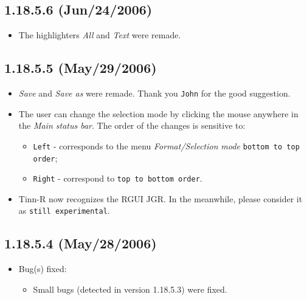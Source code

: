\subsection*{1.18.5.6 (Jun/24/2006)}
\begin{itemize}
  \item The highlighters \textit{All} and \textit{Text} were remade.
\end{itemize}


\subsection*{1.18.5.5 (May/29/2006)}
\begin{itemize}
  \item \textit{Save} and \textit{Save as} were remade. Thank you
    \texttt{John} for the good suggestion.
  \item The user can change the selection mode by clicking the mouse
    anywhere in the \textit{Main status bar}. The order of the changes
    is sensitive to:
    \begin{itemize}
      \item \texttt{Left} - corresponds to the menu
        \textit{Format/Selection mode} \texttt{bottom to top order};
      \item \texttt{Right} - correspond to \texttt{top to bottom order}.
    \end{itemize}
  \item Tinn-R now recognizes the RGUI JGR. In the meanwhile, please consider
    it as \texttt{still experimental}.
\end{itemize}


\subsection*{1.18.5.4 (May/28/2006)}
\begin{itemize}
  \item Bug(s) fixed:
    \begin{itemize}
      \item Small bugs (detected in version 1.18.5.3) were fixed.
    \end{itemize}
\end{itemize}


